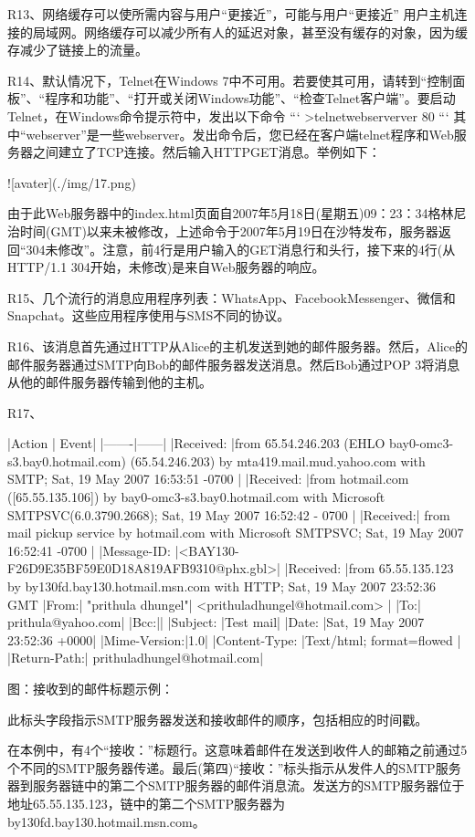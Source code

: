 \documentclass[11pt,UTF8,twoside]{article}
\begin{document}
	R13、网络缓存可以使所需内容与用户“更接近”，可能与用户“更接近” 用户主机连接的局域网。网络缓存可以减少所有人的延迟对象，甚至没有缓存的对象，因为缓存减少了链接上的流量。
	
	R14、默认情况下，Telnet在Windows 7中不可用。若要使其可用，请转到“控制面板”、“程序和功能”、“打开或关闭Windows功能”、“检查Telnet客户端”。要启动Telnet，在Windows命令提示符中，发出以下命令
	```
	>telnetwebserverver 80
	```
	其中“webserver”是一些webserver。发出命令后，您已经在客户端telnet程序和Web服务器之间建立了TCP连接。然后输入HTTPGET消息。举例如下：
	
	![avater](./img/17.png)
	
	由于此Web服务器中的index.html页面自2007年5月18日(星期五)09：23：34格林尼治时间(GMT)以来未被修改，上述命令于2007年5月19日在沙特发布，服务器返回“304未修改”。注意，前4行是用户输入的GET消息行和头行，接下来的4行(从HTTP/1.1 304开始，未修改)是来自Web服务器的响应。
	
	R15、几个流行的消息应用程序列表：WhatsApp、FacebookMessenger、微信和Snapchat。这些应用程序使用与SMS不同的协议。
	
	R16、该消息首先通过HTTP从Alice的主机发送到她的邮件服务器。然后，Alice的邮件服务器通过SMTP向Bob的邮件服务器发送消息。然后Bob通过POP 3将消息从他的邮件服务器传输到他的主机。
	
	R17、
	
	|Action | Event|
	|-------|------|
	|Received: |from 65.54.246.203 (EHLO bay0-omc3-s3.bay0.hotmail.com) (65.54.246.203) by mta419.mail.mud.yahoo.com with SMTP; Sat, 19 May 2007 16:53:51 -0700 |
	|Received: |from hotmail.com ([65.55.135.106]) by bay0-omc3-s3.bay0.hotmail.com with Microsoft SMTPSVC(6.0.3790.2668); Sat, 19 May 2007 16:52:42 - 0700 |
	|Received:| from mail pickup service by hotmail.com with Microsoft SMTPSVC; Sat, 19 May 2007 16:52:41 -0700 |
	|Message-ID: |<BAY130-F26D9E35BF59E0D18A819AFB9310@phx.gbl>|
	|Received: |from 65.55.135.123 by by130fd.bay130.hotmail.msn.com with HTTP; Sat, 19 May 2007 23:52:36 GMT 
	|From:| "prithula dhungel"| <prithuladhungel@hotmail.com> |
	|To:| prithula@yahoo.com|
	|Bcc:|| 
	|Subject: |Test mail| 
	|Date: |Sat, 19 May 2007 23:52:36 +0000| 
	|Mime-Version:|1.0| 
	|Content-Type: |Text/html; format=flowed |
	|Return-Path:| prithuladhungel@hotmail.com|
	
	图：接收到的邮件标题示例：
	
	此标头字段指示SMTP服务器发送和接收邮件的顺序，包括相应的时间戳。
	
	在本例中，有4个“接收：”标题行。这意味着邮件在发送到收件人的邮箱之前通过5个不同的SMTP服务器传递。最后(第四)“接收：”标头指示从发件人的SMTP服务器到服务器链中的第二个SMTP服务器的邮件消息流。发送方的SMTP服务器位于地址65.55.135.123，链中的第二个SMTP服务器为by130fd.bay130.hotmail.msn.com。
	
\end{document}
